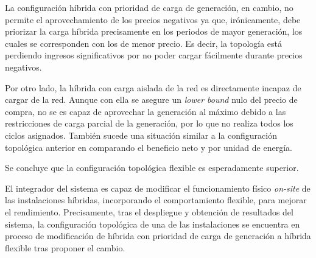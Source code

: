 La configuración híbrida con prioridad de carga de generación, en cambio, no permite el aprovechamiento de los precios negativos ya que, irónicamente, debe priorizar la carga híbrida precisamente en los periodos de mayor generación, los cuales se corresponden con los de menor precio. Es decir, la topología está perdiendo ingresos significativos por no poder cargar fácilmente durante precios negativos.

Por otro lado, la híbrida con carga aislada de la red es directamente incapaz de cargar de la red. Aunque con ella se asegure un \textit{lower bound} nulo del precio de compra, no se es capaz de aprovechar la generación al máximo debido a las restricciones de carga parcial de la generación, por lo que no realiza todos los ciclos asignados. También sucede una situación similar a la configuración topológica anterior en comparando el beneficio neto y por unidad de energía.

\begin{table}[ht]
  \centering
  \caption[Comparación de configuraciones topológicas híbridas.]{Comparación de las metricas de las configuraciones topológicas híbridas.}
  \label{tab:comparacion-hibridacion}
\end{table}

Se concluye que la configuración topológica flexible es esperadamente superior.

El integrador del sistema es capaz de modificar el funcionamiento físico \textit{on-site} de las instalaciones híbridas, incorporando el comportamiento flexible, para mejorar el rendimiento. Precisamente, tras el despliegue y obtención de resultados del sistema, la configuración topológica de una de las instalaciones se encuentra en proceso de modificación de híbrida con prioridad de carga de generación a híbrida flexible tras proponer el cambio.

